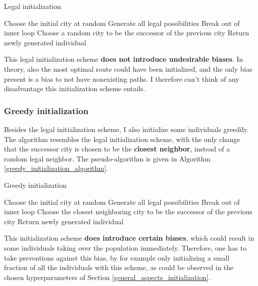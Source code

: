 \documentclass[a4paper,10pt]{article}
\begin{document}
\begin{algorithm}
\caption{Legal initialization}\label{legal_initialization_algorithm}
\begin{algorithmic}
\State Choose the initial city at random
\State Generate all legal possibilities
\State Break out of inner loop
\EndIf
\State Choose a random city to be the successor of the previous city
\EndWhile
{}
\State Return newly generated individual
\EndIf
\EndWhile
\end{algorithmic}
\end{algorithm}

This legal initialization scheme \textbf{does not introduce undesirable biases}. In theory, also the most optimal route could have been initialized, and the only bias present is a bias to not have nonexisting paths. I therefore can't think of any disadvantage this initialization scheme entails. 

\subsubsection{Greedy initialization}
\label{greedy_initialization}
Besides the legal initialization scheme, I also initialize some individuals greedily. The algorithm resembles the legal initialization scheme, with the only change that the successor city is chosen to be the \textbf{closest neighbor}, instead of a random legal neighbor. The pseudo-algorithm is given in Algorithm \ref{greedy_initialization_algorithm}.

\begin{algorithm}
\caption{Greedy initialization}\label{greedy_initialization_algorithm}
\begin{algorithmic}
\State Choose the initial city at random
\State Generate all legal possibilities
\State Break out of inner loop
\EndIf
\State Choose the closest neighboring city to be the successor of the previous city
\EndWhile
{}
\State Return newly generated individual
\EndIf
\EndWhile
\end{algorithmic}
\end{algorithm}

This initialization scheme \textbf{does introduce certain biases}, which could result in some individuals taking over the population immediately. Therefore, one has to take preventions against this bias, by for example only initializing a small fraction of all the individuals with this scheme, as could be observed in the chosen hyperparameters of Section \ref{general_aspects_initialization}.
\end{document}
